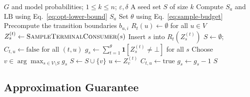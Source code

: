 \documentclass[sigconf]{acmart}
\newcommand{\CIMRIS}{\textsc{CIM-RIS}}
\begin{document}
\begin{algorithm}[t]
\caption{\CIMRIS{}: Trajectory Sampling and Coverage Greedy}
\label{alg:cim-ris}
\begin{algorithmic}[1]
\Require $G$ and model probabilities; $1\le k\le n$; $\varepsilon,\delta$
\Ensure A seed set $S$ of size $k$
\State Compute $S_a$ and $\mathrm{LB}$ using Eq.~\eqref{eq:opt-lower-bound}
  \State \Return $S_a$
\EndIf
\State Set $\theta$ using Eq.~\eqref{eq:sample-budget}
\State Precompute the transition boundaries $b_{u,i}$
  \State $R_t(u)\gets\emptyset$ for all $u\in V$
    \State $Z_s^{(t)}\gets\Call{SampleTerminalConsumer}{s}$
      \State Insert $s$ into $R_t(Z_s^{(t)})$
    \EndIf
  \EndFor
\EndFor
\State $S\gets\emptyset$; $C_{t,u}\gets\mathrm{false}$ for all $(t,u)$
\State $g_s\gets\sum_{t=1}^\theta\mathbf1[Z_s^{(t)}\ne\bot]$ for all $s$
  \State Choose $v\in\arg\max_{s\in V\setminus S}g_s$
  \State $S\gets S\cup\{v\}$
    \State $u\gets Z_v^{(t)}$
        \State $C_{t,u}\gets\mathrm{true}$
          \State $g_s\gets g_s-1$
        \EndFor
      \EndIf
    \EndIf
  \EndFor
\EndFor
\State \Return $S$
\end{algorithmic}
\end{algorithm}

\subsection{Approximation Guarantee}
\label{sec:theoretical-guarantees}
\end{document}
